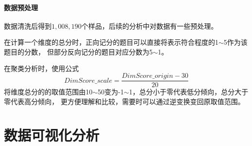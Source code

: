 \documentclass[UTF8]{ctexart}
\begin{document}
\subsection*{数据预处理}
数据清洗后得到$1,008,190$个样品，后续的分析中对数据有一些预处理。\par
在计算一个维度的总分时，正向记分的题目可以直接将表示符合程度的1$\sim$5作为该题目的分数，
但部分反向记分的题目对应分数为5$\sim$1。\par
在聚类分析时，使用公式
\begin{equation}
  DimScore\_scale = \frac{DimScore\_origin - 30}{20}
  \label{scale}
\end{equation}
将维度总分的的取值范围由10$\sim$50变为-1$\sim$1，总分小于零代表低分倾向，总分大于零代表高分倾向，
更方便理解和比较，需要时可以通过逆变换变回原取值范围。
\part{数据可视化分析}
\setcounter{section}{0}
\end{document}
